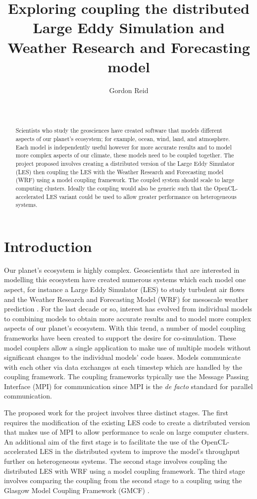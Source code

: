 \documentclass{acm_proc_article-sp}
\title{Exploring coupling the distributed Large Eddy Simulation and Weather
Research and Forecasting model}
\author{
    \alignauthor
    Gordon Reid\\
    \affaddr{School of Computing Science}\\
    \affaddr{University of Glasgow}\\
    \email{1002536r@student.gla.ac.uk}
}
\begin{document}
\maketitle

\begin{abstract}

Scientists who study the geosciences have created software that models different
aspects of our planet's ecosystem; for example, ocean, wind, land, and
atmosphere. Each model is independently useful however for more accurate results
and to model more complex aspects of our climate, these models need to be
coupled together. The project proposed involves creating a distributed version
of the Large Eddy Simulator (LES) then coupling the LES with the Weather
Research and Forecasting model (WRF) using a model coupling framework. The
coupled system should scale to large computing clusters. Ideally the coupling
would also be generic such that the OpenCL-accelerated LES variant could be used
to allow greater performance on heterogeneous systems.

\end{abstract}

\section{Introduction}

Our planet's ecosystem is highly complex. Geoscientists that are interested in
modelling this ecosystem have created numerous systems which each model one
aspect, for instance a Large Eddy Simulator (LES) to study turbulent air flows
\cite{Nakayama2011,Nakayama2012} and the Weather Research and Forecasting Model
(WRF) for mesoscale weather prediction \cite{Michalakes2000}. For the last
decade or so, interest has evolved from individual models to combining models
\cite{Michalakes2010} to obtain more accurate results and to model more complex
aspects of our planet's ecosystem. With this trend, a number of model coupling
frameworks have been created to support the desire for co-simulation. These
model couplers allow a single application to make use of multiple models without
significant changes to the individual models' code bases. Models communicate
with each other via data exchanges at each timestep which are handled by the
coupling framework. The coupling frameworks typically use the Message Passing
Interface (MPI) for communication since MPI is the \textit{de facto} standard
for parallel communication.

The proposed work for the project involves three distinct stages. The first
requires the modification of the existing LES code to create a distributed
version that makes use of MPI to allow performance to scale on large computer
clusters. An additional aim of the first stage is to facilitate the use of the
OpenCL-accelerated LES \cite{Vanderbauwhede2014} in the distributed system to
improve the model's throughput further on heterogeneous systems. The second
stage involves coupling the distributed LES with WRF using a model coupling
framework. The third stage involves comparing the coupling from the second stage
to a coupling using the Glasgow Model Coupling Framework (GMCF)
\cite{Vanderbauwhede2014}.
\end{document}
